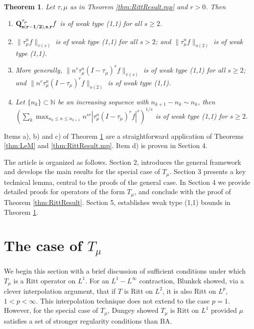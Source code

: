 \documentclass[11pt]{amsart}
\newtheorem{thm}{Theorem}[section]
\theoremstyle{definition}
\theoremstyle{remark}
\begin{document}
\begin{thm} \label{thm:main2}
Let $\tau, \mu$  as in Theorem \ref{thm:RittResult.mp} and $r> 0$. %
Then
\begin{enumerate}
\item  %
${\bf Q^{\tau_{\mu}}_{s(r-1/2),s,r}}f$ is of weak type (1,1) for all $s\ge 2$. 
\item %
 $\lVert  \tau_{\mu}^nf\rVert_{v(s)}$ is of weak type (1,1) for all $s>2$; and $\lVert  \tau_{\mu}^n f\rVert_{o(2)}$ is of weak type (1,1).
 \item %
 More generally, 
  $\lVert n^{r} \tau_{\mu}^n (I-\tau_{\mu})^r  f\rVert_{v(s)}$ is of weak type (1,1) for all $s\ge 2$; and $\lVert n^{r}  \tau_{\mu}^n  (I-\tau_{\mu})^r  f\rVert_{o(2)}$ is of weak type (1,1).
 \item %
 Let $\{n_k\}\subset \mathbb N$ be an increasing sequence with $n_{k+1}-n_k \sim n_k$, then\\
 $\left( \sum_k \max_{n_k\le n\le n_{k+1}} n^{sr}|\tau_{\mu}^n(I-\tau_{\mu})^rf|^s \right)^{1/s}$ 
 is of weak type (1,1) for $s\ge 2$. 
\end{enumerate}
\end{thm}
Items a), b) and c) of Theorem \ref{thm:main2} are a straightforward application of Theorems \ref{thm:LeM} and \ref{thm:RittResult.mp}. Item d) is proven in Section 4. 
\medskip

 The article is organized as follows. Section 2, introduces the general framework and develops the main results for the special case of $T_{\mu}$.
 Section 3 presents a key technical lemma, central to the proofs of the general case. In Section 4 we provide detailed proofs for operators of the form $T_{\mu}$, and conclude with the proof of Theorem \ref{thm:RittResult}. Section 5, establishes weak type (1,1) bounds in Theorem \ref{thm:main2}.

\section{The case of  $T_{\mu}$} %

 We begin this section with a brief discussion of sufficient conditions under which $T_{\mu}$ is a Ritt operator on $L^1$. 
 For an $L^1-L^{\infty}$ contraction, Blunkck \cite{Bl} showed, via a clever interpolation argument, that if $T$ is Ritt on $L^2$, it is also Ritt on $L^p$, $1<p<\infty$. This interpolation technique does not extend to the case $p=1$. However, for the special case of $T_{\mu}$,
 Dungey  \cite{Dunn} showed $T_{\mu}$ is Ritt on $L^1$ provided $\mu$ satisfies a set of stronger regularity conditions than BA.
 
\end{document}
